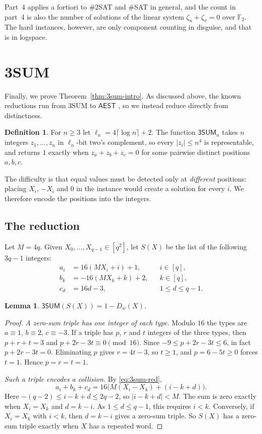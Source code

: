 \documentclass[11pt]{article}
\newtheorem{lemma}[theorem]{Lemma}
\theoremstyle{definition}
\newtheorem{definition}[theorem]{Definition}
\theoremstyle{remark}
\newcommand{\F}{\mathbb{F}}
\newcommand{\AEST}{\mathsf{AEST}}
\newcommand{\TSUM}{\mathsf{3SUM}}
\begin{document}
Part~4 applies a fortiori to $\#$2SAT and $\#$SAT in general, and the
count in part~4 is also the number of solutions of the linear system
$\zeta_u+\zeta_v=0$ over $\F_2$. The hard instances, however, are only
component counting in disguise, and that is in logspace.

\section{3SUM}\label{sec:3sum}

Finally, we prove Theorem~\ref{thm:3sum-intro}. As discussed above, the
known reductions run from 3SUM to $\AEST$ \cite{VWX}, so we instead reduce
directly from distinctness.

\begin{definition}
For $n\ge3$ let $\ell_n=4\lceil\log n\rceil+2$. The function $\TSUM_n$
takes $n$ integers $z_1,\dots,z_n$ in $\ell_n$-bit two's complement, so
every $|z_i|\le n^4$ is representable, and returns $1$ exactly when
$z_a+z_b+z_c=0$ for some pairwise distinct positions $a,b,c$.
\end{definition}

The difficulty is that equal values must be detected only at
\emph{different} positions: placing $X_i$, $-X_i$ and $0$ in the instance
would create a solution for every $i$. We therefore encode the positions
into the integers.

\subsection{The reduction}
Let $M=4q$. Given $X_0,\dots,X_{q-1}\in[q^2]$, let $S(X)$ be the list of
the following $3q-1$ integers:
\begin{equation}\label{eq:3sum-red}
\begin{aligned}
a_i&=16(MX_i+i)+1, &&i\in[q],\\
b_k&=-16(MX_k+k)+2, &&k\in[q],\\
c_d&=16d-3, &&1\le d\le q-1.
\end{aligned}
\end{equation}

\begin{lemma}\label{lem:3sum-correct}
$\TSUM(S(X))=1-D_w(X)$.
\end{lemma}
\begin{proof}
\emph{A zero-sum triple has one integer of each type.} Modulo $16$ the
types are $a\equiv1$, $b\equiv2$, $c\equiv-3$. If a triple has $p$, $r$
and $t$ integers of the three types, then $p+r+t=3$ and
$p+2r-3t\equiv0\pmod{16}$. Since $-9\le p+2r-3t\le6$, in fact
$p+2r-3t=0$. Eliminating $p$ gives $r=4t-3$, so $t\ge1$, and $p=6-5t\ge0$
forces $t=1$. Hence $p=r=t=1$.

\emph{Such a triple encodes a collision.} By \eqref{eq:3sum-red},
\[
a_i+b_k+c_d=16\bigl(M(X_i-X_k)+(i-k+d)\bigr).
\]
Here $-(q-2)\le i-k+d\le 2q-2$, so $|i-k+d|<M$. The sum is zero exactly
when $X_i=X_k$ and $d=k-i$. As $1\le d\le q-1$, this requires $i<k$.
Conversely, if $X_i=X_k$ with $i<k$, then $d=k-i$ gives a zero-sum triple.
So $S(X)$ has a zero-sum triple exactly when $X$ has a repeated word.
\end{proof}
\end{document}
